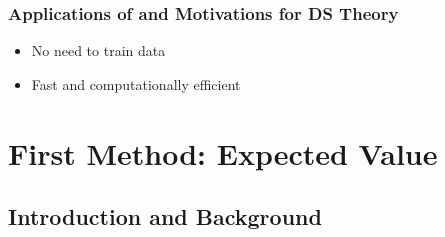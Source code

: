 \documentclass{beamer}
\newenvironment{figure*}%
{\begin{figure}}
{\end{figure}}
\begin{document}
\begin{frame}
\frametitle{Applications of and Motivations for DS Theory}
\begin{figure}\centering
{}
{}
{}
    \label{apps}
    \end{figure}
\begin{itemize}
\item{No need to train data}
\item{Fast and computationally efficient}
\end{itemize}
\end{frame}

\section{First Method: Expected Value}

\subsection{Introduction and Background}
\end{document}
